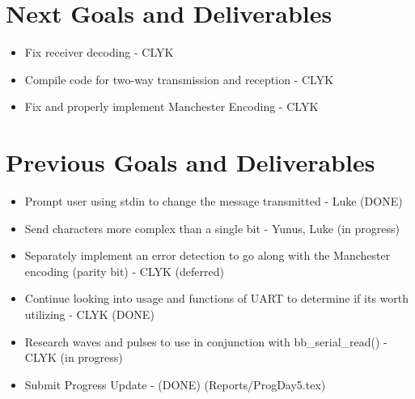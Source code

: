 \documentclass{article}
\begin{document}
\section*{Next Goals and Deliverables}
\begin{itemize}
\item Fix receiver decoding - CLYK

\item Compile code for two-way transmission and reception - CLYK

\item Fix and properly implement Manchester Encoding - CLYK

\end{itemize}
\section*{Previous Goals and Deliverables}
\begin{itemize}
\item Prompt user using stdin to change the message transmitted - Luke (DONE)
\item Send characters more complex than a single bit - Yunus, Luke (in progress)
\item Separately implement an error detection to go along with the Manchester encoding (parity bit) - CLYK (deferred)
\item Continue looking into usage and functions of UART to determine if its worth utilizing - CLYK (DONE)
\item Research waves and pulses to use in conjunction with bb\_serial\_read() - CLYK (in progress)
\item Submit Progress Update - (DONE) (Reports/ProgDay5.tex)
\end{itemize}
\end{document}

